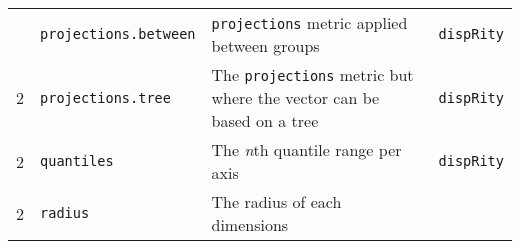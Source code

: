 \documentclass[
]{book}
\begin{document}
\begin{longtable}[]{@{}llll@{}}
\begin{minipage}[t]{0.07\columnwidth}
\end{minipage} & \begin{minipage}[t]{0.07\columnwidth}\raggedright
\texttt{projections.between}\strut
\end{minipage} & \begin{minipage}[t]{0.64\columnwidth}\raggedright
\texttt{projections} metric applied between groups\strut
\end{minipage} & \begin{minipage}[t]{0.10\columnwidth}\raggedright
\texttt{dispRity}\strut
\end{minipage}\tabularnewline
\begin{minipage}[t]{0.07\columnwidth}\raggedright
2\strut
\end{minipage} & \begin{minipage}[t]{0.07\columnwidth}\raggedright
\texttt{projections.tree}\strut
\end{minipage} & \begin{minipage}[t]{0.64\columnwidth}\raggedright
The \texttt{projections} metric but where the vector can be based on a tree\strut
\end{minipage} & \begin{minipage}[t]{0.10\columnwidth}\raggedright
\texttt{dispRity}\strut
\end{minipage}\tabularnewline
\begin{minipage}[t]{0.07\columnwidth}\raggedright
2\strut
\end{minipage} & \begin{minipage}[t]{0.07\columnwidth}\raggedright
\texttt{quantiles}\strut
\end{minipage} & \begin{minipage}[t]{0.64\columnwidth}\raggedright
The \emph{n}th quantile range per axis\strut
\end{minipage} & \begin{minipage}[t]{0.10\columnwidth}\raggedright
\texttt{dispRity}\strut
\end{minipage}\tabularnewline
\begin{minipage}[t]{0.07\columnwidth}\raggedright
2\strut
\end{minipage} & \begin{minipage}[t]{0.07\columnwidth}\raggedright
\texttt{radius}\strut
\end{minipage} & \begin{minipage}[t]{0.64\columnwidth}\raggedright
The radius of each dimensions\strut
\end{minipage} & \begin{minipage}[t]{0.10\columnwidth}\raggedright

\end{minipage}
\end{longtable}
\end{document}
